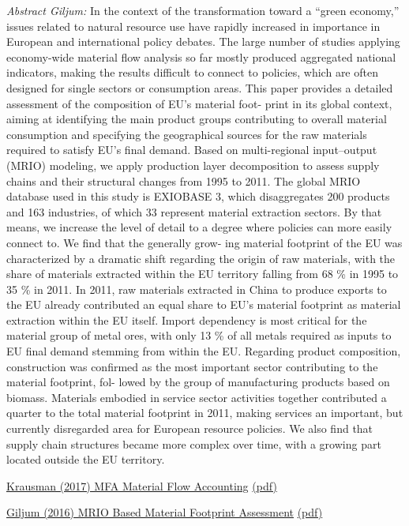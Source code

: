 \documentclass[
]{book}
\begin{document}
\emph{Abstract Giljum:}
In the context of the transformation toward a ``green economy,'' issues related to natural
resource use have rapidly increased in importance in European and international policy
debates. The large number of studies applying economy-wide material flow analysis
so far mostly produced aggregated national indicators, making the results difficult to
connect to policies, which are often designed for single sectors or consumption areas.
This paper provides a detailed assessment of the composition of EU's material foot-
print in its global context, aiming at identifying the main product groups contributing
to overall material consumption and specifying the geographical sources for the raw
materials required to satisfy EU's final demand. Based on multi-regional input--output
(MRIO) modeling, we apply production layer decomposition to assess supply chains
and their structural changes from 1995 to 2011. The global MRIO database used in this
study is EXIOBASE 3, which disaggregates 200 products and 163 industries, of which 33
represent material extraction sectors. By that means, we increase the level of detail to
a degree where policies can more easily connect to. We find that the generally grow-
ing material footprint of the EU was characterized by a dramatic shift regarding the
origin of raw materials, with the share of materials extracted within the EU territory
falling from 68 \% in 1995 to 35 \% in 2011. In 2011, raw materials extracted in China to
produce exports to the EU already contributed an equal share to EU's material footprint
as material extraction within the EU itself. Import dependency is most critical for the
material group of metal ores, with only 13 \% of all metals required as inputs to EU final
demand stemming from within the EU. Regarding product composition, construction
was confirmed as the most important sector contributing to the material footprint, fol-
lowed by the group of manufacturing products based on biomass. Materials embodied
in service sector activities together contributed a quarter to the total material footprint
in 2011, making services an important, but currently disregarded area for European
resource policies. We also find that supply chain structures became more complex over
time, with a growing part located outside the EU territory.

\href{https://www.annualreviews.org/doi/10.1146/annurev-environ-102016-060726}{Krausman (2017) MFA Material Flow Accounting}
\href{pdf/Krausman_2017_MFA.pdf}{(pdf)}

\href{https://journalofeconomicstructures.springeropen.com/articles/10.1186/s40008-016-0048-5\#Abs1}{Giljum (2016) MRIO Based Material Footprint Assessment}
\href{pdf/Giljum_2016_MRIO_based_Material_Footprint.pdf}{(pdf)}
\end{document}
